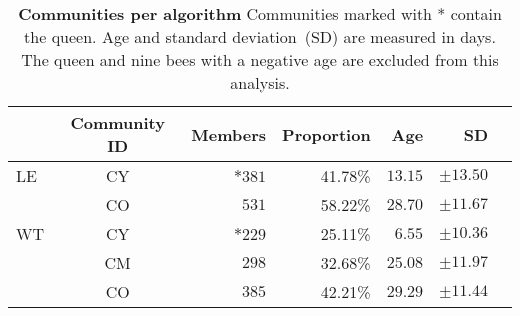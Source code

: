 \begin{table}[htb]
\small
\centering
\caption[Communities per algorithm]{\textbf{Communities per algorithm} Communities marked with * contain the queen. Age and standard deviation~(SD) are measured in days. The queen and nine bees with a negative age are excluded from this analysis.}
\label{tab:n3-communities}
\vspace*{5mm}
\begin{tabular}{lcrrrrr}
	\toprule
	{}  & Community ID & Members & Proportion & Age & SD\\
	\midrule  
	\quad LE  & CY & $*381$  & 41.78\% & $13.15$ & $\pm13.50$ \\
	          & CO & $531$   & 58.22\% & $28.70$ & $\pm11.67$ \\
    \midrule 
	\quad WT & CY & $*229$  & 25.11\% & $6.55$  & $\pm10.36$\\
			 & CM & $298$  & 32.68\% & $25.08$ & $\pm11.97$\\
			 & CO & $385$  & 42.21\% & $29.29$ & $\pm11.44$\\
	\bottomrule
\end{tabular}
\end{table}